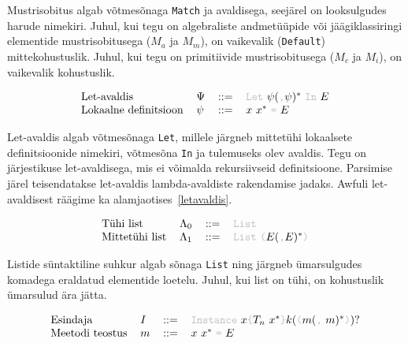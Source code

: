 \documentclass[12pt]{article}
\begin{document}
      Mustrisobitus algab võtmesõnaga \verb!Match! ja avaldisega, seejärel on looksulgudes harude nimekiri. Juhul, kui tegu on algebraliste andmetüüpide või jäägiklassiringi elementide mustrisobitusega ($M_a$ ja $M_m$), on vaikevalik (\verb!Default!) mittekohustuslik. Juhul, kui tegu on primitiivide mustrisobitusega ($M_c$ ja $M_i$), on vaikevalik kohustuslik.

      \begin{equation*}
        \begin{tabular}{llll}
          Let-avaldis           & $\Psi$ & $::=$ & {\color{helehall}\verb!Let!} $\psi(${\color{helehall}\verb!,!}$\psi)^*$ {\color{helehall}\verb!In!} $E$ \\
          Lokaalne definitsioon & $\psi$ & $::=$ & $x$ $x^*$ {\color{helehall}\verb!=!} $E$
        \end{tabular}
      \end{equation*}

      Let-avaldis algab võtmesõnaga \verb!Let!, millele järgneb mittetühi lokaalsete definitsioonide nimekiri, võtmesõna \verb!In! ja tulemuseks olev avaldis. Tegu on järjestikuse let-avaldisega, mis ei võimalda rekursiivseid definitsioone. Parsimise järel teisendatakse let-avaldis lambda-avaldiste rakendamise jadaks. Awfuli let-avaldisest räägime ka alamjaotises~\ref{letavaldis}.

      \begin{equation*}
        \begin{tabular}{llll}
          Tühi list      & $\Lambda_0$ & $::=$ & {\color{helehall}\verb!List!}                                                                                          \\
          Mittetühi list & $\Lambda_1$ & $::=$ & {\color{helehall}\verb!List!} {\color{helehall}\verb!(!}$E(${\color{helehall}\verb!,!}$E)^*${\color{helehall}\verb!)!}
        \end{tabular}
      \end{equation*}

      Listide süntaktiline suhkur algab sõnaga \verb!List! ning järgneb ümarsulgudes komadega eraldatud elementide loetelu. Juhul, kui list on tühi, on kohustuslik ümarsulud ära jätta.

      \begin{equation*}
        \begin{tabular}{llll}
          Esindaja        & $I$ & $::=$ & {\color{helehall}\verb!Instance!} $x${\color{helehall}\verb!{!}$T_n$ $x^*${\color{helehall}\verb!}!}$k(${\color{helehall}\verb!(!}$m(${\color{helehall}\verb!,!} $m)^*${\color{helehall}\verb!)!}$)?$ \\
          Meetodi teostus & $m$ & $::=$ & $x$ $x^*$ {\color{helehall}\verb!=!} $E$
        \end{tabular}
      \end{equation*}
\end{document}

